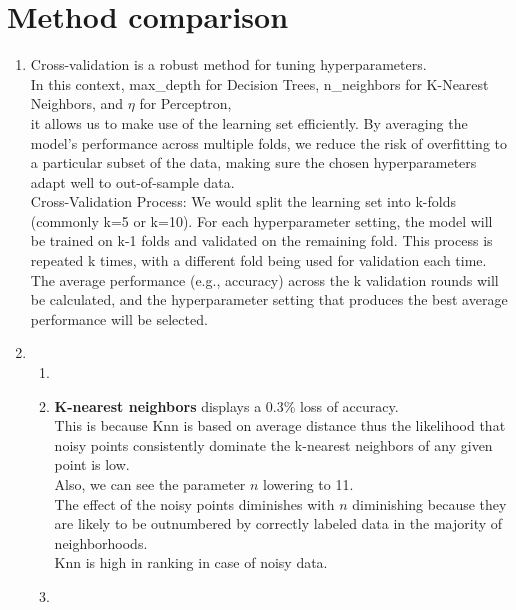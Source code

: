 \documentclass[acmconf,nonacm=true]{acmart}
\begin{document}
\section{Method comparison}
\begin{enumerate}
    \item Cross-validation is a robust method for tuning hyperparameters. \\
     In this context, max\_depth for Decision Trees, n\_neighbors for K-Nearest Neighbors, and $\eta$ for Perceptron,\\
     it allows us to make use of the learning set efficiently.
     By averaging the model's performance across multiple folds, we reduce the risk of overfitting to a particular subset of the data, making sure the chosen hyperparameters adapt well to out-of-sample data.\\
     Cross-Validation Process:
    	We would split the learning set into k-folds (commonly k=5 or k=10).
    	For each hyperparameter setting, the model will be trained on k-1 folds and validated on the remaining fold.
    	This process is repeated k times, with a different fold being used for validation each time.
    	The average performance (e.g., accuracy) across the k validation rounds will be calculated, and the hyperparameter setting that produces the best average performance will be selected.
    \item
\begin{enumerate}
    \item 
    \item \textbf{K-nearest neighbors} displays a 0.3\% loss of accuracy.\\
    This is because Knn is based on average distance thus the likelihood that noisy points consistently dominate the k-nearest neighbors of any given point is low.\\
    Also, we can see the parameter $n$ lowering to 11.\\
    The effect of the noisy points diminishes with $n$ diminishing because they are likely to be outnumbered by correctly labeled data in the majority of neighborhoods.\\
    Knn is high in ranking in case of noisy data.
    \item 



\end{enumerate}
\end{enumerate}
\end{document}
